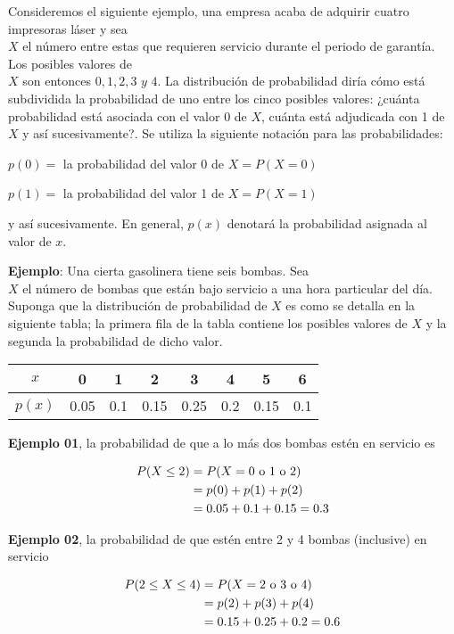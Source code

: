 \documentclass[
]{book}
\begin{document}
Consideremos el siguiente ejemplo, una empresa acaba de adquirir cuatro impresoras láser y sea\\
\(X\) el número entre estas que requieren servicio durante el periodo de garantía. Los posibles valores de\\
\(X\) son entonces \(0, 1, 2, 3 \,\, y\,\, 4\). La distribución de probabilidad diría cómo está subdividida la probabilidad de uno entre los cinco posibles valores: ¿cuánta probabilidad está asociada con el valor 0 de \(X\), cuánta está adjudicada con 1 de \(X\) y así sucesivamente?. Se utiliza la siguiente notación para las probabilidades:

\(p(0) =\) la probabilidad del valor 0 de \(X = P(X=0)\)

\(p(1) =\) la probabilidad del valor 1 de \(X = P(X=1)\)

y así sucesivamente. En general, \(p(x)\) denotará la probabilidad asignada al valor de \(x\).

\textbf{Ejemplo}: Una cierta gasolinera tiene seis bombas. Sea\\
\(X\) el número de bombas que están bajo servicio a una hora particular del día. Suponga que la distribución de probabilidad de \(X\) es como se detalla en la siguiente tabla; la primera fila de la tabla contiene los posibles valores de \(X\) y la segunda la probabilidad de dicho valor.

\begin{longtable}[]{@{}cccccccc@{}}
\toprule\noalign{}
\(x\) & 0 & 1 & 2 & 3 & 4 & 5 & 6 \\
\midrule\noalign{}
\endhead
\bottomrule\noalign{}
\endlastfoot
\(p(x)\) & 0.05 & 0.1 & 0.15 & 0.25 & 0.2 & 0.15 & 0.1 \\
\end{longtable}

\textbf{Ejemplo 01}, la probabilidad de que a lo más dos bombas estén en servicio es

\begin{equation}
  \notag
  \begin{split}
    P(X\leq 2) &= P(X = 0 \text{ o } 1 \text{ o } 2) \\
    & = p(0) + p(1) + p(2) \\
    & = 0.05 + 0.1 + 0.15 = 0.3
  \end{split}
\end{equation}

\textbf{Ejemplo 02}, la probabilidad de que estén entre 2 y 4 bombas (inclusive) en servicio

\begin{equation}
  \notag
  \begin{split}
    P(2\leq X\leq 4) &= P(X = 2 \text{ o } 3 \text{ o } 4)\\
    & = p(2) + p(3) + p(4) \\
    & = 0.15 + 0.25 + 0.2 = 0.6
  \end{split}
\end{equation}
\end{document}
